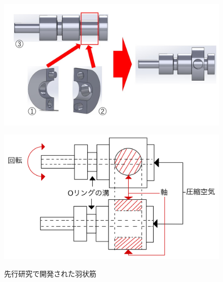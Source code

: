 \begin{figure}[ht]
  \begin{minipage}{0.59\hsize}
    \centering  
    \includegraphics[scale=0.27]{image/tanbu_parts.jpg}
    \label{fig:tanbu_parts}
  \end{minipage}
  \begin{minipage}{0.39\hsize}
    \centering
    \includegraphics[scale=0.085]{image/MPA_irast.jpg}
    \label{fig:tanbu_moshikizu}
  \end{minipage}
  \caption{先行研究で開発された羽状筋}
  \label{fig:tanbu_parts_new}
\end{figure}
